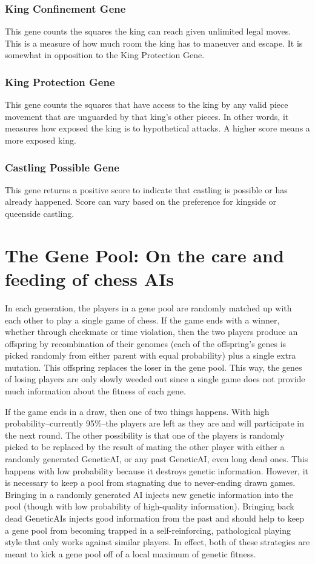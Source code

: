 \documentclass[letter]{article}
\renewcommand\_{\textunderscore\allowbreak}
\begin{document}
\subsubsection{King Confinement Gene}
This gene counts the squares the king can reach given unlimited legal moves. This is a measure of how much room the king has to maneuver and escape. It is somewhat in opposition to the King Protection Gene.

\subsubsection{King Protection Gene}
This gene counts the squares that have access to the king by any valid piece movement that are unguarded by that king's other pieces. In other words, it measures how exposed the king is to hypothetical attacks. A higher score means a more exposed king.

\subsubsection{Castling Possible Gene}
This gene returns a positive score to indicate that castling is possible or has already happened. Score can vary based on the preference for kingside or queenside castling.




\section{The Gene Pool: On the care and feeding of chess AIs}

In each generation, the players in a gene pool are randomly matched up with each other to play a single game of chess. If the game ends with a winner, whether through checkmate or time violation, then the two players produce an offspring by recombination of their genomes (each of the offspring's genes is picked randomly from either parent with equal probability) plus a single extra mutation. This offspring replaces the loser in the gene pool. This way, the genes of losing players are only slowly weeded out since a single game does not provide much information about the fitness of each gene.

If the game ends in  a draw, then one of two things happens. With high probability--currently 95\%--the players are left as they are and will participate in the next round. The other possibility is that one of the players is randomly picked to be replaced by the result of mating the other player with either a randomly generated Genetic\_AI, or any past Genetic\_AI, even long dead ones. This happens with low probability because it destroys genetic information. However, it is necessary to keep a pool from stagnating due to never-ending drawn games. Bringing in a randomly generated AI injects new genetic information into the pool (though with low probability of high-quality information). Bringing back dead Genetic\_AIs injects good information from the past and should help to keep a gene pool from becoming trapped in a self-reinforcing, pathological playing style that only works against similar players. In effect, both of these strategies are meant to kick a gene pool off of a local maximum of genetic fitness.
\end{document}
